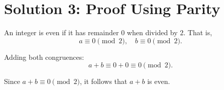 \documentclass{article}
\begin{document}
\section*{Solution 3: Proof Using Parity}
An integer is even if it has remainder $0$ when divided by $2$. That is,
\begin{equation}
    a \equiv 0 \pmod{2}, \quad b \equiv 0 \pmod{2}.
\end{equation}

Adding both congruences:
\begin{equation}
    a + b \equiv 0 + 0 \equiv 0 \pmod{2}.
\end{equation}

Since $a + b \equiv 0 \pmod{2}$, it follows that $a + b$ is even.
\end{document}

